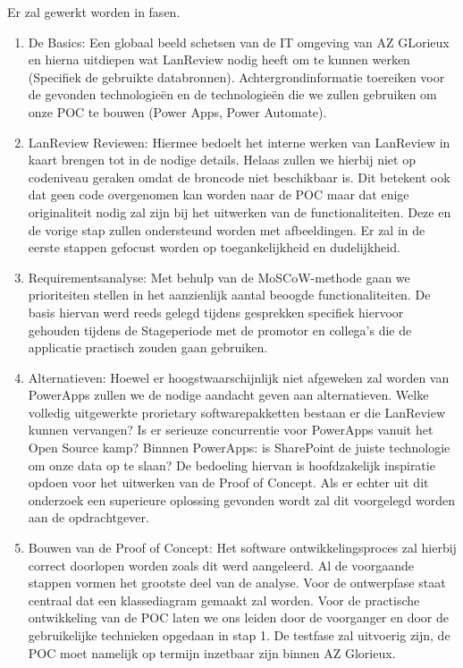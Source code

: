 \vspace{5mm}

Er zal gewerkt worden in fasen. 
\begin{enumerate}
    \item De Basics: Een globaal beeld schetsen van de IT omgeving van AZ GLorieux en hierna uitdiepen wat LanReview nodig heeft om te kunnen werken (Specifiek de gebruikte databronnen). Achtergrondinformatie toereiken voor de gevonden technologieën en de technologieën die we zullen gebruiken om onze POC te bouwen (Power Apps, Power Automate).
    \item LanReview Reviewen: Hiermee bedoelt het interne werken van LanReview in kaart brengen tot in de nodige details. Helaas zullen we hierbij niet op codeniveau geraken omdat de broncode niet beschikbaar is. Dit betekent ook dat geen code overgenomen kan worden naar de POC maar dat enige originaliteit nodig zal zijn bij het uitwerken van de functionaliteiten. Deze en de vorige stap zullen ondersteund worden met afbeeldingen. Er zal in de eerste stappen gefocust worden op toegankelijkheid en dudelijkheid.
    \item Requirementsanalyse: Met behulp van de MoSCoW-methode gaan we prioriteiten stellen in het aanzienlijk aantal beoogde functionaliteiten. De basis hiervan werd reeds gelegd tijdens gesprekken specifiek hiervoor gehouden tijdens de Stageperiode met de promotor en collega's die de applicatie practisch zouden gaan gebruiken.
    \item Alternatieven: Hoewel er hoogstwaarschijnlijk niet afgeweken zal worden van PowerApps zullen we de nodige aandacht geven aan alternatieven. Welke volledig uitgewerkte prorietary softwarepakketten bestaan er die LanReview kunnen vervangen? Is er serieuze concurrentie voor PowerApps vanuit het Open Source kamp? Binnnen PowerApps: is SharePoint de juiste technologie om onze data op te slaan? De bedoeling hiervan is hoofdzakelijk inspiratie opdoen voor het uitwerken van de Proof of Concept. Als er echter uit dit onderzoek een superieure oplossing gevonden wordt zal dit voorgelegd worden aan de opdrachtgever.
   \item Bouwen van de Proof of Concept: Het software ontwikkelingsproces zal hierbij correct doorlopen worden zoals dit werd aangeleerd. Al de voorgaande stappen vormen het grootste deel van de analyse. Voor de ontwerpfase staat centraal dat een klassediagram gemaakt zal worden. Voor de practische ontwikkeling van de POC laten we ons leiden door de voorganger en door de gebruikelijke technieken opgedaan in stap 1. De testfase zal uitvoerig zijn, de POC moet namelijk op termijn inzetbaar zijn binnen AZ Glorieux.

\end{enumerate}
